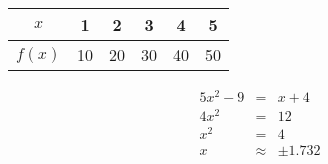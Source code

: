 \documentclass[12pt]{article}
\begin{document}
	
\begin{tabular}{|c|c|c|c|c|c|}
\hline
$x$ & 1 & 2 & 3 & 4 & 5\\ \hline
$f(x)$ & 10 & 20 & 30 & 40 & 50\\ \hline

\end{tabular}

\begin{eqnarray*}
5x^2-9&=&x+4\\
4x^2&=&12\\
x^2&=&4\\
x&\approx&\pm1.732
\end{eqnarray*}
	
\end{document}
